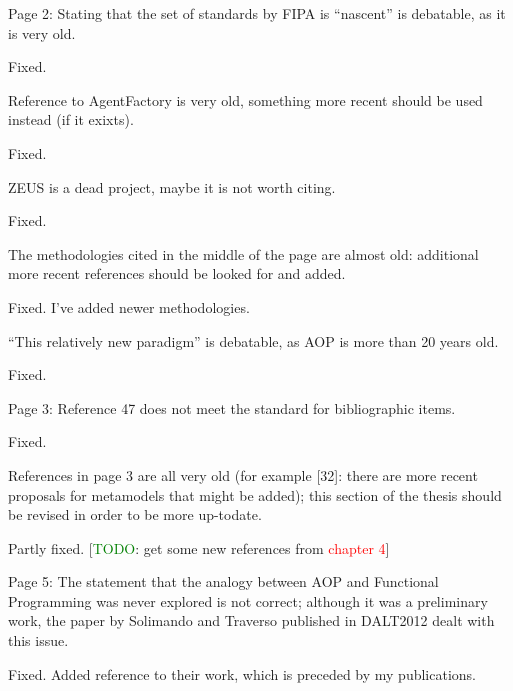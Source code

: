 \documentclass{article}
\newcommand*\R[1]{\textcolor{red}{#1}} %
\newcommand{\todo}[1]{[\textcolor{green}{TODO}: #1]}
\newenvironment{them}{\noindent\begingroup\color{blue}}{\endgroup\par}
\begin{document}
\begin{them}

Page 2:
Stating that the set of standards by FIPA is “nascent” is debatable, as it is
very old.

\end{them}
Fixed.

\begin{them}

Reference to AgentFactory is very old, something more recent should be used
instead (if it exixts).

\end{them}
Fixed.

\begin{them}

ZEUS is a dead project, maybe it is not worth citing.
\end{them}
Fixed.

\begin{them}

The methodologies cited in the middle of the page are almost old: additional
more recent references should be looked for and added.

\end{them}
Fixed. I've added newer methodologies.

\begin{them}

“This relatively new paradigm” is debatable, as AOP is more than 20 years old.
\end{them}
Fixed.

\begin{them}

Page 3:
Reference 47 does not meet the standard for bibliographic items.

\end{them}
Fixed.

\begin{them}

References in page 3 are all very old (for example [32]: there are more recent
proposals for metamodels that might be added); this section of the thesis
should be revised in order to be more up-todate.

\end{them}
Partly fixed.
\todo{get some new references from \R{chapter 4}}

\begin{them}

Page 5:
The statement that the analogy between AOP and Functional Programming was never
explored is not correct; although it was a preliminary work, the paper by
Solimando and Traverso published in DALT2012 dealt with this issue.

\end{them}
Fixed. Added reference to their work, which is preceded by my publications.
\end{document}
